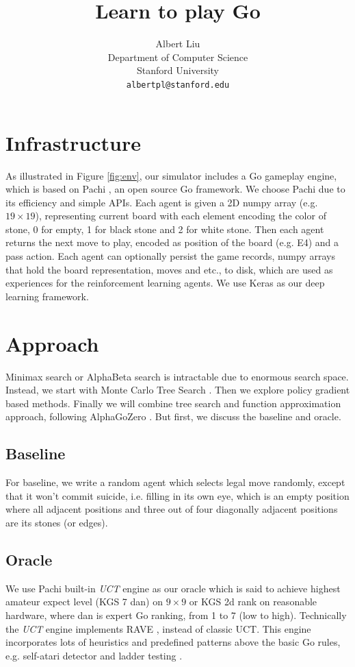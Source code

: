 \documentclass{article}
\title{Learn to play Go}
\author{%
  Albert Liu \\
  Department of Computer Science\\
  Stanford University\\
  \texttt{albertpl@stanford.edu} \\
}
\begin{document}
\maketitle

\section{Infrastructure}
As illustrated in Figure \ref{fig:env}, our simulator includes a Go gameplay engine, which is based on Pachi \cite{baudivs2011pachi}, an open source Go framework. We choose Pachi due to its efficiency and simple APIs. Each agent is given a 2D numpy array (e.g. $19 \times 19$), representing current board with each element encoding the color of stone, 0 for empty, 1 for black stone and 2 for white stone. Then each agent returns the next move to play, encoded as position of the board (e.g. E4) and a pass action. 
Each agent can optionally persist the game records, numpy arrays that hold the board representation, moves and etc., to disk, which are used as experiences for the reinforcement learning agents. We use Keras as our deep learning framework. 

\section{Approach}
Minimax search or AlphaBeta search is intractable due to enormous search space. Instead, we start with Monte Carlo Tree Search \cite{coulom2006efficient}. Then we explore policy gradient based methods. Finally we will combine tree search and function approximation approach, following AlphaGoZero \cite{silver2017masteringalphagozero}.  But first, we discuss the baseline and oracle.

\subsection{Baseline}
For baseline, we write a random agent which selects legal move randomly, except that it won't commit suicide, i.e. filling in its own eye, which is an empty position where all adjacent positions and three out of four diagonally adjacent positions are its stones (or edges).

\subsection{Oracle}
We use Pachi built-in \textit{UCT} engine as our oracle which is said to achieve highest amateur expect level (KGS 7 dan) on $9 \times 9$ or KGS 2d rank on reasonable hardware, where dan is expert Go ranking, from 1 to 7 (low to high). Technically the \textit{UCT} engine implements RAVE \cite{gelly2007combining}, instead of classic UCT. This engine incorporates lots of heuristics and predefined patterns above the basic Go rules, e.g. self-atari detector and ladder testing \cite{baudivs2011pachi}.
\end{document}
